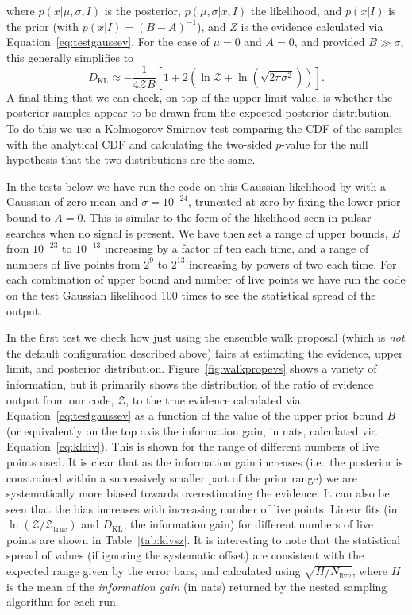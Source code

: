where $p(x|\mu,\sigma,I)$ is the posterior, $p(\mu,\sigma|x,I)$ the likelihood, and $p(x|I)$ is the prior (with $p(x|I) = (B-A)^{-1}$), and $Z$ is the
evidence calculated via Equation~\ref{eq:testgaussev}. For the case of $\mu=0$ and $A=0$, and provided $B \gg \sigma$, this generally simplifies
to
\begin{equation}
D_{\text{KL}} \approx -\frac{1}{4\mathcal{Z}B}\left[1+2\left(\ln{\mathcal{Z}} +\ln{\left(\sqrt{2\pi\sigma^2}\right)}\right)\right].
\end{equation}
A final thing that we can check, on top of the upper limit value, is whether the posterior samples appear to be drawn from the expected
posterior distribution. To do this we use a Kolmogorov-Smirnov test comparing the CDF of the samples with the analytical CDF and calculating the
two-sided $p$-value for the null hypothesis that the two distributions are the same.

In the tests below we have run the code on this Gaussian likelihood by with a Gaussian of zero mean and $\sigma = 10^{-24}$, truncated at zero
by fixing the lower prior bound to $A=0$. This is similar to the form of the likelihood seen in pulsar searches when no signal is present.
We have then set a range of upper bounds, $B$ from $10^{-23}$ to $10^{-13}$ increasing by a factor of ten each time, and a range of numbers of
live points from $2^9$ to $2^{13}$ increasing by powers of two each time. For each combination of upper bound and number of live points we have
run the code on the test Gaussian likelihood 100 times to see the statistical spread of the output.

In the first test we check how just using the ensemble walk proposal (which is {\it not} the default configuration described above) fairs at
estimating the evidence, upper limit, and posterior distribution. Figure~\ref{fig:walkpropevs} shows a variety of information, but it
primarily shows the distribution of the ratio of evidence output from our code, $\mathcal{Z}$, to the true evidence calculated via
Equation~\ref{eq:testgaussev} as a function of the value of the upper prior bound $B$ (or equivalently on the top axis the
information gain, in nats, calculated via Equation~\ref{eq:kldiv}). This is shown for the range of different numbers of live points used.
It is clear that as the information gain increases (i.e.\ the posterior is constrained within a successively smaller part of the
prior range) we are systematically more biased towards overestimating the evidence. It can also be seen that the bias increases with
increasing number of live points. Linear fits (in $\ln{(\mathcal{Z}/\mathcal{Z}_{\text{true}})}$ and $D_{\text{KL}}$, the information gain) for different numbers
of live points are shown in Table~\ref{tab:klvsz}. It is interesting to note that the statistical spread of values (if ignoring the
systematic offset) are consistent with the expected range given by the error bars, and calculated using $\sqrt{H/N_{\text{live}}}$, where
$H$ is the mean of the {\it information gain} (in nats) returned by the nested sampling algorithm for each run.


